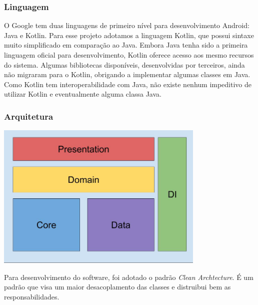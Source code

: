 \documentclass[a4paper, 12pt]{article}
\begin{document}
\subsubsection{Linguagem}

O Google tem duas linguagens de primeiro nível para desenvolvimento Android: Java e Kotlin. Para esse projeto adotamos a linguagem Kotlin, que possui sintaxe muito simplificado em comparação ao Java. Embora Java tenha sido a primeira linguagem oficial para desenvolvimento, Kotlin oferece acesso aos mesmo recursos do sistema.
Algumas bibliotecas disponíveis, desenvolvidas por terceiros, ainda não migraram para o Kotlin, obrigando a implementar algumas classes em Java. Como Kotlin tem interoperabilidade com Java, não existe nenhum impeditivo de utilizar Kotlin e eventualmente alguma classa Java.

\subsubsection{Arquitetura}

\includegraphics[width=10cm, center]{images/brick_diagram_bus_tracker}

Para desenvolvimento do software, foi adotado o padrão \textit{Clean Archtecture}. É um padrão que visa um maior desacoplamento das classes e distruibui bem as responsabilidades.
\end{document}
